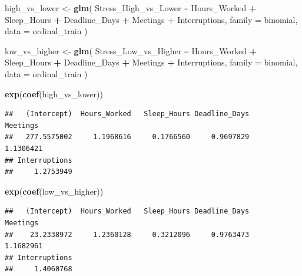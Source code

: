 \documentclass[
]{article}
\newenvironment{Shaded}{\begin{snugshade}}{\end{snugshade}}
\newcommand{\AttributeTok}[1]{\textcolor[rgb]{0.13,0.29,0.53}{#1}}
\newcommand{\FunctionTok}[1]{\textcolor[rgb]{0.13,0.29,0.53}{\textbf{#1}}}
\newcommand{\NormalTok}[1]{#1}
\newcommand{\OtherTok}[1]{\textcolor[rgb]{0.56,0.35,0.01}{#1}}
\newcommand{\SpecialCharTok}[1]{\textcolor[rgb]{0.81,0.36,0.00}{\textbf{#1}}}
\begin{document}
\begin{Shaded}
\begin{Highlighting}[]
\NormalTok{high\_vs\_lower }\OtherTok{\textless{}{-}} \FunctionTok{glm}\NormalTok{(}
\NormalTok{  Stress\_High\_vs\_Lower }\SpecialCharTok{\textasciitilde{}}\NormalTok{ Hours\_Worked }\SpecialCharTok{+}\NormalTok{ Sleep\_Hours }\SpecialCharTok{+}
\NormalTok{    Deadline\_Days }\SpecialCharTok{+}\NormalTok{ Meetings }\SpecialCharTok{+}\NormalTok{ Interruptions,}
  \AttributeTok{family =}\NormalTok{ binomial,}
  \AttributeTok{data =}\NormalTok{ ordinal\_train}
\NormalTok{)}

\NormalTok{low\_vs\_higher }\OtherTok{\textless{}{-}} \FunctionTok{glm}\NormalTok{(}
\NormalTok{  Stress\_Low\_vs\_Higher }\SpecialCharTok{\textasciitilde{}}\NormalTok{ Hours\_Worked }\SpecialCharTok{+}\NormalTok{ Sleep\_Hours }\SpecialCharTok{+}
\NormalTok{    Deadline\_Days }\SpecialCharTok{+}\NormalTok{ Meetings }\SpecialCharTok{+}\NormalTok{ Interruptions,}
  \AttributeTok{family =}\NormalTok{ binomial,}
  \AttributeTok{data =}\NormalTok{ ordinal\_train}
\NormalTok{)}
\end{Highlighting}
\end{Shaded}

\begin{Shaded}
\begin{Highlighting}[]
\FunctionTok{exp}\NormalTok{(}\FunctionTok{coef}\NormalTok{(high\_vs\_lower))}
\end{Highlighting}
\end{Shaded}

\begin{verbatim}
##   (Intercept)  Hours_Worked   Sleep_Hours Deadline_Days      Meetings 
##   277.5575002     1.1968616     0.1766560     0.9697829     1.1306421 
## Interruptions 
##     1.2753949
\end{verbatim}

\begin{Shaded}
\begin{Highlighting}[]
\FunctionTok{exp}\NormalTok{(}\FunctionTok{coef}\NormalTok{(low\_vs\_higher))}
\end{Highlighting}
\end{Shaded}

\begin{verbatim}
##   (Intercept)  Hours_Worked   Sleep_Hours Deadline_Days      Meetings 
##    23.2338972     1.2360128     0.3212096     0.9763473     1.1682961 
## Interruptions 
##     1.4060768
\end{verbatim}
\end{document}
